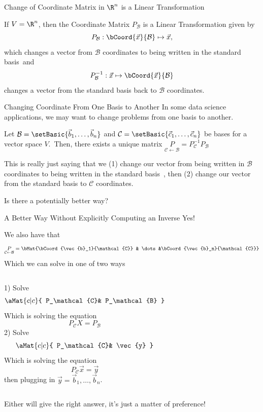 \documentclass[xcoler=dvipsnames, aspectratio=169]{beamer}
\newcommand{\B}{\mathcal{B}}
\newcommand{\C}{\mathcal{C}}
\begin{document}
    \begin{frame}{Change of Coordinate Matrix in $\R^n$ is a Linear Transformation}
        \begin{theorem}
            If $V=\R^n$, then the Coordinate Matrix $P_\B$ is a Linear Transformation given by
            \[
                P_\B:\bCoord{\vec{x}}{\B}\mapsto\vec{x},
            \]
            which changes a vector from $\B$ coordinates to being written in the standard basis\pause\
            and
            \[
                P^{-1}_\B:\vec{x}\mapsto\bCoord{\vec{x}}{\B}
            \]
            changes a vector from the standard basis back to $\B$ coordinates.
        \end{theorem}
    \end{frame}
    \begin{frame}{Changing Coordinate From One Basis to Another}
        In some data science applications, we may want to change problems from one basis to another.
        \pause
        \begin{theorem}
            Let $\B=\setBasic{\vec{b}_1, \dots, \vec{b}_n}$ and $\C=\setBasic{\vec{c}_1,\dots,\vec{c}_n}$
            be bases for a vector space $V$.\pause\ Then, there exists a unique matrix
            $\underset{\C\leftarrow\B}{P}=P^{-1}_\C P_\B$
        \end{theorem}\pause

        This is really just saying that we (1) change our vector from being written in $\B$ coordinates
        to being written in the standard basis\pause\ , then (2) change our vector from the standard
        basis to $\C$ coordinates.\pause\

        Is there a potentially better way?
    \end{frame}
    \begin{frame}{A Better Way Without Explicitly Computing an Inverse}
        Yes!\pause\

        We also have that
        \[
            \underset{\C\leftarrow\B}{P}=\bMat{\bCoord{\vec{b}_1}{\C} & \dots &\bCoord{\vec{b}_n}{\C}}
        \]\pause
        Which we can solve in one of two ways
        \begin{columns}
                1) Solve
                \[
                    \aMat{c|c}{
                        P_\C & P_\B
                    }
                \]\pause
                Which is solving the equation
                \[
                    P_\C X = P_\B
                \]\pause
                2) Solve
                \[
                    \aMat{c|c}{
                        P_\C & \vec{y}
                    }
                \]\pause
                Which is solving the equation
                \[
                    P_\C\vec{x} = \vec{y}
                \]
                then plugging in $\vec{y} = \vec{b}_1,\dots,\vec{b}_n$.\pause
        \end{columns}
        Either will give the right answer, it's just a matter of preference!
    \end{frame}
\end{document}

